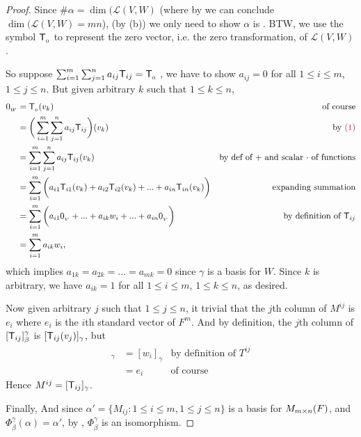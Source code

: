 \begin{proof}
Since \(\#\alpha = \dim(\mathcal{L}(V, W)\) (where by  we can conclude \(\dim(\mathcal{L}(V, W) = mn\)), (by (b)) we only need to show \(\alpha\) is \LID{}.
BTW, we use the symbol \(\textsf{T}_{_0}\) to represent the zero vector, i.e. the zero transformation, of \(\mathcal{L}(V, W)\).

So suppose \(\sum_{i = 1}^{m} \sum_{j = 1}^n a_{ij} \textsf{T}_{ij} = \textsf{T}_{_0}\) , we have to show \(a_{ij} = 0\) for all \(1 \le i \le m\), \(1 \le j \le n\).
But given arbitrary \(k\) such that \(1 \le k \le n\),
\begin{align*}
    \OW & = \TZERO(v_k) & \text{of course} \\
        & = \bigg( \sum_{i = 1}^{m} \sum_{j = 1}^n a_{ij} \T_{ij} \bigg) (v_k) & \text{by \MAROON{(1)}} \\
        & = \sum_{i = 1}^{m} \sum_{j = 1}^n a_{ij} \T_{ij} (v_k) & \text{by def of \(+\) and scalar \(\cdot\) of functions} \\
        & = \sum_{i = 1}^{m} \bigg( a_{i1} \T_{i1} (v_k) + a_{i2} \T_{i2} (v_k) + ... + a_{in} \T_{in} (v_k) \bigg) & \text{expanding summation} \\
        & = \sum_{i = 1}^{m} \bigg( a_{i1} \OV + ... + a_{ik} w_i + ... + a_{in} \OV \bigg) & \text{by definition of \(\T_{ij}\)} \\
        & = \sum_{i = 1}^m a_{ik} w_i,
\end{align*}
which implies \(a_{1k} = a_{2k} = ... = a_{mk} = 0\) since \(\gamma\) is a basis for \(W\).
Since \(k\) is arbitrary, we have \(a_{ik} = 1\) for all \(1 \le i \le m\), \(1 \le k \le n\), as desired.

Now given arbitrary \(j\) such that \(1 \le j \le n\), it trivial that the \(j\)th column of \(M^{ij}\) is \(e_i\) where \(e_i\) is the \(i\)th standard vector of \(F^m\).
And by definition, the \(j\)th column of \([\textsf{T}_{ij}]_{\beta}^{\gamma}\) is \([\textsf{T}_{ij}(v_j)]_{\gamma}\), but
\begin{align*}
    [\T_{ij}(v_j)]_{\gamma} & = [w_i]_{\gamma} & \text{by definition of \(T^{ij}\)} \\
                 & = e_i & \text{of course}
\end{align*}
Hence \(M^{ij} = [\textsf{T}_{ij}]_{\gamma}\).

Finally, And since \(\alpha' = \{ M_{ij} : 1 \le i \le m, 1 \le j \le n \}\) is a basis for \(M_{m \times n}(F)\), and \(\Phi_{\beta}^{\gamma}(\alpha) = \alpha'\), by , \(\Phi_{\beta}^{\gamma}\) is an isomorphism.
\end{proof}

